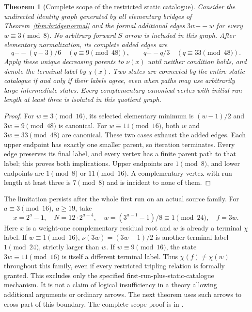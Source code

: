 \documentclass[11pt]{article}
\newtheorem{theorem}{Theorem}
\begin{document}
\begin{theorem}[Complete scope of the restricted static catalogue]
\label{thm:paircatalogue}
Consider the undirected identity graph generated by all elementary
bridges of Theorem~\ref{thm:bridgenormal} and the formal additional
edges $3w\mathbin{--}w$ for every $w\equiv3\pmod8$. No arbitrary
forward $S$ arrow is included in this graph. After elementary
normalization, its complete added edges are
\[
q\mathbin{--}(q-3)/6\quad(q\equiv9\pmod{48}),
\qquad q\mathbin{--}q/3\quad(q\equiv33\pmod{48}).
\]
Apply these unique decreasing parents to $\nu(x)$ until neither
condition holds, and denote the terminal label by $\chi(x)$.
Two states are connected by the entire static catalogue if and only
if their labels agree, even when paths may use arbitrarily large
intermediate states. Every complementary canonical vertex with initial
run length at least three is isolated in this quotient graph.
\end{theorem}
\begin{proof}
For $w\equiv3\pmod{16}$, its selected elementary minimum is
$(w-1)/2$ and $3w\equiv9\pmod{48}$ is canonical. For
$w\equiv11\pmod{16}$, both $w$ and $3w\equiv33\pmod{48}$ are
canonical. These two cases exhaust the added edges. Each upper
endpoint has exactly one smaller parent, so iteration terminates.
Every edge preserves its final label, and every vertex has a finite
parent path to that label; this proves both implications. Upper
endpoints are $1\pmod8$, and lower endpoints are $1\pmod8$ or
$11\pmod{16}$. A complementary vertex with run length at least
three is $7\pmod8$ and is incident to none of them.
\end{proof}

The limitation persists after the whole first run on an actual source
family. For $a\equiv3\pmod{16}$, $a\ge19$, take
\[
x=2^a-1,\quad N=12\cdot2^{a-4},\quad
w=(3^{a-1}-1)/8\equiv1\pmod{24},\quad f=3w.
\]
Here $x$ is a weight-one complementary residual root and $w$ is
already a terminal $\chi$ label. If $w\equiv1\pmod{16}$,
$\nu(3w)=(3w-1)/2$ is another terminal label $1\pmod{24}$,
strictly larger than $w$. If $w\equiv9\pmod{16}$, the state
$3w\equiv11\pmod{16}$ is itself a different terminal label.
Thus $\chi(f)\ne\chi(w)$ throughout this family, even if every
restricted tripling relation is formally granted.
This excludes only the specified first-run-plus-static-catalogue
mechanism. It is not a claim of logical insufficiency in a theory
allowing additional arguments or ordinary arrows. The next theorem
uses such arrows to cross part of this boundary. The complete scope
proof is in
.
\end{document}
